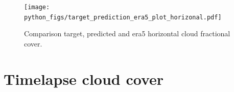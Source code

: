\begin{figure}[ht]
    \centering
    \texttt{[image: python\_figs/target\_prediction\_era5\_plot\_horizonal.pdf]}
    \caption{Comparison target, predicted and era5 horizontal cloud fractional cover.}
    \label{fig:target_predict_era5_vertical}
\end{figure}




\cleardoublepage


\chapter{Timelapse cloud cover}


